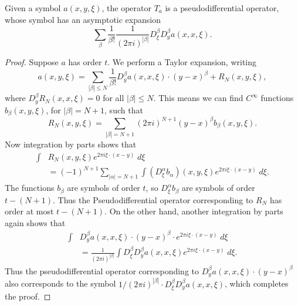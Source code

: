 \begin{lemma}
    Given a symbol $a(x,y,\xi)$, the operator $T_a$ is a pseudodifferential operator, whose symbol has an asymptotic expansion
    \[ \sum_\beta \frac{1}{\beta!} \frac{1}{(2 \pi i)^{|\beta|}} D^\beta_\xi D^\beta_y a(x,x,\xi). \]
\end{lemma}
\begin{proof}
    Suppose $a$ has order $t$. We perform a Taylor expansion, writing
    \[ a(x,y,\xi) = \sum_{|\beta| \leq N} \frac{1}{\beta !} D^\beta_y a(x,x,\xi) \cdot (y - x)^\beta + R_N(x,y,\xi), \]
    where $D^\beta_y R_N(x,x,\xi) = 0$ for all $|\beta| \leq N$. This means we can find $C^\infty$ functions $b_\beta(x,y,\xi)$, for $|\beta| = N+1$, such that
    \[ R_N(x,y,\xi) = \sum_{|\beta| = N+1} (2\pi i)^{N+1} (y - x)^\beta b_\beta(x,y,\xi). \]
    Now integration by parts shows that
    \begin{align*}
        \int & R_N(x,y,\xi) e^{2 \pi i \xi \cdot (x - y)}\; d\xi\\
        &= (-1)^{N+1} \sum_{|\alpha| = N+1} \int (D_\xi^\alpha b_\alpha)(x,y,\xi) e^{2 \pi i \xi \cdot (x - y)}\; d\xi.
    \end{align*}
    The functions $b_\beta$ are symbols of order $t$, so $D_\xi^\alpha b_\beta$ are symbols of order $t - (N+1)$. Thus the Pseudodifferential operator corresponding to $R_N$ has order at most $t - (N+1)$. On the other hand, another integration by parts again shows that
    \begin{align*}
        \int &D^\beta_y a(x,x,\xi) \cdot (y - x)^\beta \cdot e^{2 \pi i \xi \cdot (x - y)}\; d\xi\\
        &= \frac{1}{(2 \pi i)^{|\beta|}} \int D^\beta_\xi D^\beta_y a(x,x,\xi) e^{2 \pi i \xi \cdot (x - y)}\; d\xi.
    \end{align*}
    Thus the pseudodifferential operator corresponding to $D^\beta_y a(x,x,\xi) \cdot (y - x)^\beta$ also corresponds to the symbol $1 / (2 \pi i)^{|\beta|} \cdot D^\beta_\xi D^\beta_y a(x,x,\xi)$, which completes the proof.
\end{proof}

